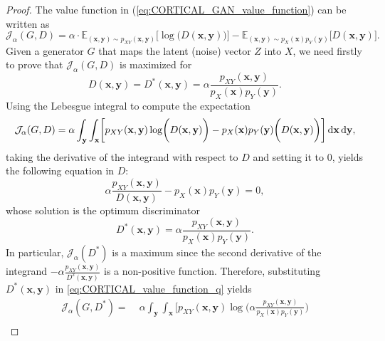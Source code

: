 \begin{proof}
The value function in (\ref{eq:CORTICAL_GAN_value_function}) can be written as
\begin{equation}
\mathcal{J}_{\alpha}(G,D) = \alpha \cdot \mathbb{E}_{(\mathbf{x},\mathbf{y}) \sim p_{XY}(\mathbf{x},\mathbf{y})}\biggl[\log \biggl(D(\mathbf{x},\mathbf{y})\biggr)\biggr] -\mathbb{E}_{(\mathbf{x},\mathbf{y}) \sim p_{X}(\mathbf{x}) p_Y(\mathbf{y})}\biggl[D(\mathbf{x},\mathbf{y})\biggr].
\label{eq:CORTICAL_value_function_p}
\end{equation}
Given a generator $G$ that maps the latent (noise) vector $Z$ into $X$, we need firstly to prove that $\mathcal{J}_{\alpha}(G,D)$ is maximized for 
\begin{equation}
D(\mathbf{x},\mathbf{y})=D^*(\mathbf{x},\mathbf{y})=\alpha  \frac{p_{XY}(\mathbf{x},\mathbf{y})}{p_{X}(\mathbf{x}) p_Y(\mathbf{y})}.
\end{equation}
Using the Lebesgue integral to compute the expectation
\begin{equation}
\mathcal{J}_{\alpha}(G, D) = \alpha  \int_{\mathbf{y}} \int_{\mathbf{x}}\biggl[p_{XY}(\mathbf{x},\mathbf{y}) \log \biggl(D(\mathbf{x},\mathbf{y})\biggr) - p_{X}(\mathbf{x}) p_Y(\mathbf{y}) \biggl(D(\mathbf{x},\mathbf{y})\biggr)\biggr] \mathop{}\!\mathrm{d} \mathbf{x} \mathop{}\!\mathrm{d} \mathbf{y},
\label{eq:CORTICAL_value_function_q}
\end{equation}
taking the derivative of the integrand with respect to $D$ and setting it to $0$, yields the following equation in $D$:
\begin{equation}
\alpha  \frac{p_{XY}(\mathbf{x},\mathbf{y})}{D(\mathbf{x},\mathbf{y})} - p_{X}(\mathbf{x}) p_Y(\mathbf{y})=0,
\end{equation}
whose solution is the optimum discriminator
\begin{equation}
D^*(\mathbf{x},\mathbf{y}) = \alpha  \frac{p_{XY}(\mathbf{x},\mathbf{y})}{p_{X}(\mathbf{x}) p_Y(\mathbf{y})}.
\end{equation}
In particular, $\mathcal{J}_{\alpha}(D^*)$ is a maximum since the second derivative of the integrand $-\alpha  \frac{p_{XY}(\mathbf{x},\mathbf{y})}{D^2(\mathbf{x},\mathbf{y})}$ is a non-positive function.
Therefore, substituting $D^*(\mathbf{x},\mathbf{y})$ in \eqref{eq:CORTICAL_value_function_q} yields
\begin{align}
\mathcal{J}_{\alpha}(G,D^*) = \; & \alpha \int_{\mathbf{y}} \int_{\mathbf{x}}{\biggl[p_{XY}(\mathbf{x},\mathbf{y}) \log \biggl(\alpha  \frac{p_{XY}(\mathbf{x},\mathbf{y})}{p_{X}(\mathbf{x}) p_Y(\mathbf{y})}} \biggr) \nonumber \\

\end{align}
\end{proof}
